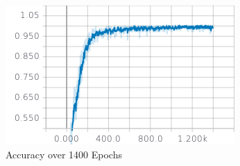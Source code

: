 \documentclass[12pt,journal,compsoc]{IEEEtran}
\begin{document}
\begin{figure}[h]
\caption{Accuracy over 1400 Epochs}
\vspace{5mm}
\includegraphics[scale=.7]{second}
\end{figure}

%




\end{document}
